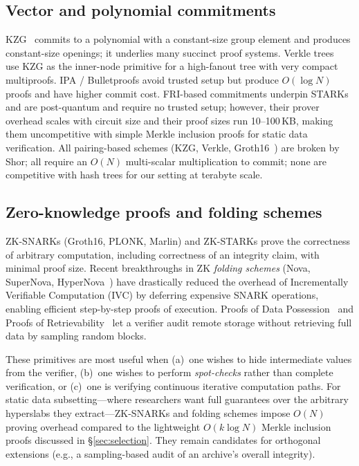 \documentclass[11pt]{article}
\begin{document}
\subsection{Vector and polynomial commitments}

KZG~\cite{kate2010kzg} commits to a polynomial with a constant-size group
element and produces constant-size openings; it underlies many succinct
proof systems. Verkle trees~\cite{verkle} use KZG as the inner-node primitive
for a high-fanout tree with very compact multiproofs. IPA / Bulletproofs
\cite{bunz2018bulletproofs} avoid trusted setup but produce $O(\log N)$ proofs
and have higher commit cost. FRI-based commitments underpin
STARKs~\cite{bensasson2018stark} and are post-quantum and require no trusted
setup; however, their prover overhead scales with circuit size and their proof
sizes run 10--100\,KB, making them uncompetitive with simple Merkle inclusion
proofs for static data verification. All pairing-based schemes (KZG, Verkle,
Groth16~\cite{groth2016sn}) are broken by Shor; all require an $O(N)$
multi-scalar multiplication to commit; none are competitive with hash trees for
our setting at terabyte scale.

\subsection{Zero-knowledge proofs and folding schemes}

ZK-SNARKs (Groth16, PLONK, Marlin) and ZK-STARKs prove the correctness of
arbitrary computation, including correctness of an integrity claim, with
minimal proof size. Recent breakthroughs in ZK \emph{folding schemes} (Nova,
SuperNova, HyperNova~\cite{kothapalli2022nova}) have drastically reduced the
overhead of Incrementally Verifiable Computation (IVC) by deferring expensive
SNARK operations, enabling efficient step-by-step proofs of execution.
Proofs of Data Possession~\cite{ateniese2007pdp} and Proofs of
Retrievability~\cite{juels2007por} let a verifier audit remote storage without
retrieving full data by sampling random blocks.

These primitives are most useful when (a)~one wishes to hide intermediate
values from the verifier, (b)~one wishes to perform \emph{spot-checks} rather
than complete verification, or (c)~one is verifying continuous iterative
computation paths. For static data subsetting---where researchers want full
guarantees over the arbitrary hyperslabs they extract---ZK-SNARKs and folding
schemes impose $O(N)$ proving overhead compared to the lightweight
$O(k\log N)$ Merkle inclusion proofs discussed in \S\ref{sec:selection}. They
remain candidates for orthogonal extensions (e.g., a sampling-based audit of
an archive's overall integrity).
\end{document}
